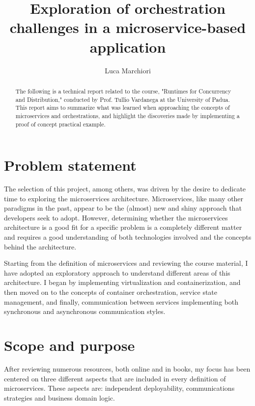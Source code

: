\documentclass[manuscript,screen,review]{acmart}
\begin{document}
\title{Exploration of orchestration challenges in a microservice-based application}


\author{Luca Marchiori}

\begin{abstract}
  The following is a technical report related to the course, "Runtimes for Concurrency and Distribution," conducted by Prof. Tullio Vardanega at the University of Padua. This report aims to summarize what was learned when approaching the concepts of microservices and orchestrations, and highlight the discoveries made by implementing a proof of concept practical example.
\end{abstract}

\maketitle


\section{Problem statement}
The selection of this project, among others, was driven by the desire to dedicate time to exploring the microservices architecture. Microservices, like many other paradigms in the past, appear to be the (almost) new and shiny approach that developers seek to adopt. However, determining whether the microservices architecture is a good fit for a specific problem is a completely different matter and requires a good understanding of both technologies involved and the concepts behind the architecture.

Starting from the definition of microservices and reviewing the course material, I have adopted an exploratory approach to understand different areas of this architecture. I began by implementing virtualization and containerization, and then moved on to the concepts of  container orchestration, service state management, and finally, communication between services implementing both synchronous and asynchronous communication styles.

\section{Scope and purpose}
After reviewing numerous resources, both online and in books, my focus has been centered on three different aspects that are included in every definition of microservices. These aspects are: independent deployability, communications strategies and business domain logic. 
\end{document}
